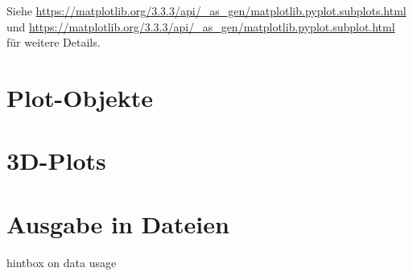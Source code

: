 Siehe \url{https://matplotlib.org/3.3.3/api/_as_gen/matplotlib.pyplot.subplots.html} und \url{https://matplotlib.org/3.3.3/api/_as_gen/matplotlib.pyplot.subplot.html} für weitere Details.

\section{Plot-Objekte}
 

\section{3D-Plots}


\section{Ausgabe in Dateien}
hintbox on data usage

